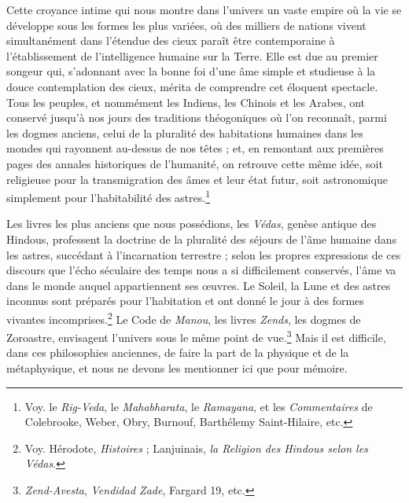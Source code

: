 \documentclass[a4paper, 11pt, oneside, landscape]{article}
\begin{document}
Cette croyance intime qui nous montre dans l'univers un vaste empire où la vie se développe sous les formes les plus variées, où des milliers de nations vivent simultanément dans l'étendue des cieux paraît être contemporaine à l'établissement de l'intelligence humaine sur la Terre. Elle est due au premier songeur qui, s'adonnant avec la bonne foi d'une âme simple et studieuse à la douce contemplation des cieux, mérita de comprendre cet éloquent spectacle. Tous les peuples, et nommément les Indiens, les Chinois et les Arabes, ont conservé jusqu'à nos jours des traditions théogoniques où l'on reconnaît, parmi les dogmes anciens, celui de la pluralité des habitations humaines dans les mondes qui rayonnent au-dessus de nos têtes ; et, en remontant aux premières pages des annales historiques de l'humanité, on retrouve cette même idée, soit religieuse pour la transmigration des âmes et leur état futur, soit astronomique simplement pour l'habitabilité des astres.\footnote{Voy. le \emph{Rig-Veda}, le \emph{Mahabharata}, le \emph{Ramayana}, et les \emph{Commentaires} de Colebrooke, Weber, Obry, Burnouf, Barthélemy Saint-Hilaire, etc.}

Les livres les plus anciens que nous possédions, les \emph{Védas}, genèse antique des Hindous, professent la doctrine de la pluralité des séjours de l'âme humaine dans les astres, succédant à l'incarnation terrestre ; selon les propres expressions de ces discours que l'écho séculaire des temps nous a si difficilement conservés, l'âme va dans le monde auquel appartiennent ses œuvres. Le Soleil, la Lune et des astres inconnus sont préparés pour l'habitation et ont donné le jour à des formes vivantes incomprises.\footnote{Voy. Hérodote, \emph{Histoires} ; Lanjuinais, \emph{la Religion des Hindous selon les Védas}.} Le Code de \emph{Manou}, les livres \emph{Zends}, les dogmes de Zoroastre, envisagent l'univers sous le même point de vue.\footnote{\emph{Zend-Avesta}, \emph{Vendidad Zade}, Fargard 19, etc.} Mais il est difficile, dans ces philosophies anciennes, de faire la part de la physique et de la métaphysique, et nous ne devons les mentionner ici que pour mémoire.
\end{document}
